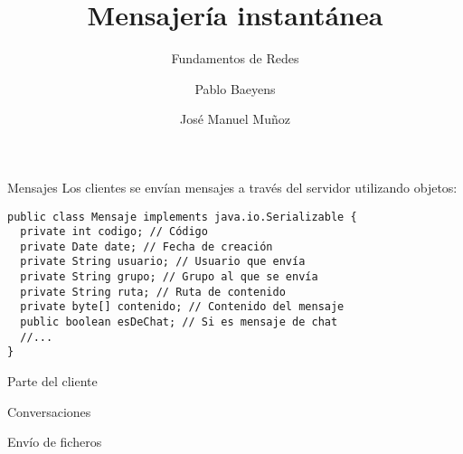 \documentclass[compress]{beamer}
\title{Mensajería instantánea}
\subtitle{Fundamentos de Redes}
\author{Pablo Baeyens \and José Manuel Muñoz}
\date{}
\begin{document}
\begin{frame}
\titlepage
\end{frame}

\begin{frame}[fragile]{Mensajes}
  Los clientes se envían mensajes a través del servidor utilizando objetos:

\begin{lstlisting}
public class Mensaje implements java.io.Serializable {
  private int codigo; // Código
  private Date date; // Fecha de creación
  private String usuario; // Usuario que envía
  private String grupo; // Grupo al que se envía
  private String ruta; // Ruta de contenido
  private byte[] contenido; // Contenido del mensaje
  public boolean esDeChat; // Si es mensaje de chat
  //...
}
\end{lstlisting}
\end{frame}

\begin{frame}{Parte del cliente}
\end{frame}

\begin{frame}{Conversaciones}
\end{frame}

\begin{frame}{Envío de ficheros}
\end{frame}
\end{document}
